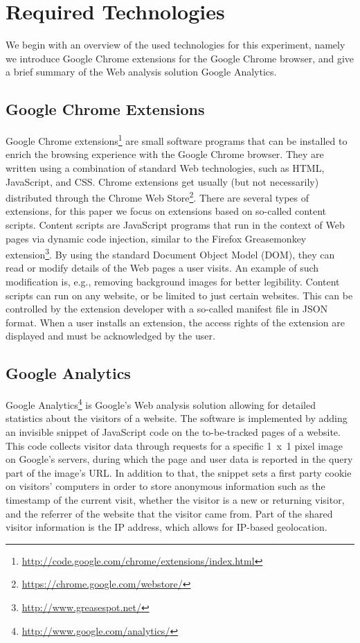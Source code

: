 \documentclass[runningheads,a4paper]{llncs}
\begin{document}
\section{Required Technologies}\label{sec:reqtec}
We begin with an overview of the used technologies for this experiment, namely we introduce Google Chrome extensions for the Google Chrome browser, and give a brief summary of the Web analysis solution Google Analytics.

\subsection{Google Chrome Extensions}
Google Chrome extensions\footnote{\url{http://code.google.com/chrome/extensions/index.html}} are small software programs that can be installed to enrich the browsing experience with the Google Chrome browser. They are written using a combination of standard Web technologies, such as HTML, JavaScript, and CSS. Chrome extensions get usually (but not necessarily) distributed through the Chrome Web Store\footnote{\url{https://chrome.google.com/webstore/}}. There are several types of extensions, for this paper we focus on extensions based on so-called content scripts. Content scripts are JavaScript programs that run in the context of Web pages via dynamic code injection, similar to the Firefox Greasemonkey extension\footnote{\url{http://www.greasespot.net/}}. By using the standard Document Object Model (DOM), they can read or modify details of the Web pages a user visits. An example of such modification is, e.g., removing background images for better legibility. Content scripts can run on any website, or be limited to just certain websites. This can be controlled by the extension developer with a so-called manifest file in JSON format. When a user installs an extension, the access rights of the extension are displayed and must be acknowledged by the user.

\subsection{Google Analytics}
Google Analytics\footnote{\url{http://www.google.com/analytics/}} is Google's Web analysis solution allowing for detailed statistics about the visitors of a website. The software is implemented by adding an invisible snippet of JavaScript code on the to-be-tracked pages of a website. This code collects visitor data through requests for a specific 1~x~1 pixel image on Google's servers, during which the page and user data is reported in the query part of the image's URL. In addition to that, the snippet sets a first party cookie on visitors' computers in order to store anonymous information such as the timestamp of the current visit, whether the visitor is a new or returning visitor, and the referrer of the website that the visitor came from. Part of the shared visitor information is the IP address, which allows for IP-based geolocation.
 
\end{document}
